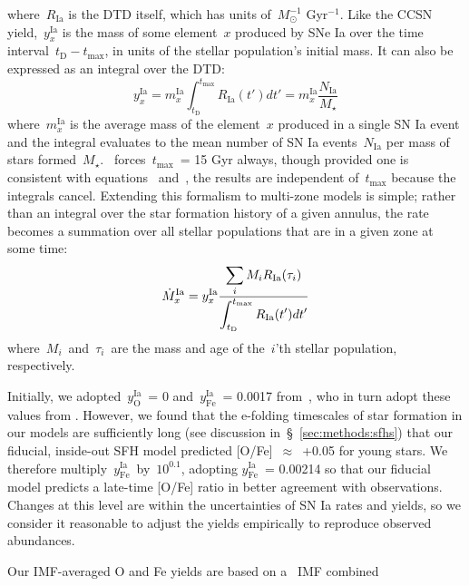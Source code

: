\documentclass[draft2.tex]{subfiles}
\begin{document}
where~$R_\text{Ia}$ is the DTD itself, which has units of~$M_\odot^{-1}$ 
Gyr$^{-1}$. 
Like the CCSN yield,~$y_x^\text{Ia}$ is the mass of some element~$x$ produced 
by SNe Ia over the time interval~$t_\text{D} - t_\text{max}$, in units of the 
stellar population's initial mass. 
It can also be expressed as an integral over the DTD: 
\begin{equation} 
y_x^\text{Ia} = m_x^\text{Ia} \int_{t_\text{D}}^{t_\text{max}} R_\text{Ia}(t') 
dt' = m_x^\text{Ia}\frac{N_\text{Ia}}{M_\star} 
\label{eq:y_x_ia} 
\end{equation} 
where~$m_x^\text{Ia}$ is the average mass of the element~$x$ produced in a 
single SN Ia event and the integral evaluates to the mean number of SN Ia 
events~$N_\text{Ia}$ per mass of stars formed~$M_\star$. 
\vice~forces~$t_\text{max}$~= 15 Gyr always, though provided one is consistent 
with equations~ and~, the results are 
independent of~$t_\text{max}$ because the integrals cancel. 
Extending this formalism to multi-zone models is simple; rather than an 
integral over the star formation history of a given annulus, the rate becomes 
a summation over all stellar populations that are in a given zone at some time: 
\begin{equation} 
\dot{M}_x^\text{Ia} = y_x^\text{Ia} \frac{\displaystyle 
	\sum_i M_i R_\text{Ia}(\tau_i) 
}{\displaystyle 
	\int_{t_\text{D}}^{t_\text{max}} R_\text{Ia}(t')dt' 
} 
\label{eq:mdot_ia_multizone} 
\end{equation} 
where~$M_i$~and~$\tau_i$~are the mass and age of the~$i$'th stellar population, 
respectively. 
\par 
Initially, we adopted~$y_\text{O}^\text{Ia}$~= 0 and~$y_\text{Fe}^\text{Ia}$~= 
0.0017 from~\citet{Johnson2020}, who in turn adopt these values from 
\citet{Weinberg2017}. 
However, we found that the e-folding timescales of star formation in our models 
are sufficiently long (see discussion in~\S~\ref{sec:methods:sfhs}) that our 
fiducial, inside-out SFH model predicted [O/Fe]~$\approx$~+0.05 for young 
stars. 
We therefore multiply~$y_\text{Fe}^\text{Ia}$~by~$10^{0.1}$, adopting 
$y_\text{Fe}^\text{Ia}$~= 0.00214 so that our fiducial model predicts a 
late-time [O/Fe] ratio in better agreement with observations. 
Changes at this level are within the uncertainties of SN Ia rates and yields, 
so we consider it reasonable to adjust the yields empirically to reproduce 
observed abundances. 
\par 
Our IMF-averaged O and Fe yields are based on a~\citet{Kroupa2001} IMF combined 
\end{document}
